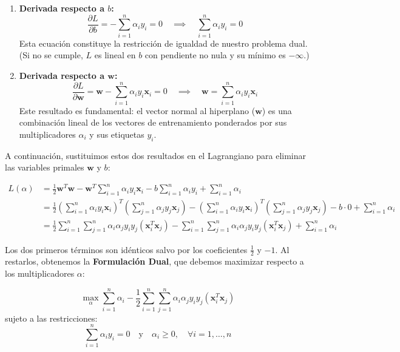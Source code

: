 \documentclass[12pt, a4paper]{article}
\begin{document}
\begin{enumerate}
    \item \textbf{Derivada respecto a $b$:}
    \[ \frac{\partial L}{\partial b} = -\sum_{i=1}^n \alpha_i y_i = 0 \quad \implies \quad \sum_{i=1}^n \alpha_i y_i = 0 \]
    Esta ecuación constituye la restricción de igualdad de nuestro problema dual. (Si no se cumple, $L$ es lineal en $b$ con pendiente no nula y su mínimo es $-\infty$.)

    \item \textbf{Derivada respecto a $\mathbf{w}$:}
    \[ \frac{\partial L}{\partial \mathbf{w}} = \mathbf{w} - \sum_{i=1}^n \alpha_i y_i \mathbf{x}_i = 0 \quad \implies \quad \mathbf{w} = \sum_{i=1}^n \alpha_i y_i \mathbf{x}_i \]
    Este resultado es fundamental: el vector normal al hiperplano ($\mathbf{w}$) es una combinación lineal de los vectores de entrenamiento ponderados por sus multiplicadores $\alpha_i$ y sus etiquetas $y_i$.
\end{enumerate}

\noindent A continuación, sustituimos estos dos resultados en el Lagrangiano para eliminar las variables primales $\mathbf{w}$ y $b$:

\begin{align*}
L(\alpha) &= \frac{1}{2} \mathbf{w}^T \mathbf{w} - \mathbf{w}^T \sum_{i=1}^n \alpha_i y_i \mathbf{x}_i - b \sum_{i=1}^n \alpha_i y_i + \sum_{i=1}^n \alpha_i \\
&= \frac{1}{2} \left( \sum_{i=1}^n \alpha_i y_i \mathbf{x}_i \right)^T \left( \sum_{j=1}^n \alpha_j y_j \mathbf{x}_j \right) - \left( \sum_{i=1}^n \alpha_i y_i \mathbf{x}_i \right)^T \left( \sum_{j=1}^n \alpha_j y_j \mathbf{x}_j \right) - b \cdot 0 + \sum_{i=1}^n \alpha_i \\
&= \frac{1}{2} \sum_{i=1}^n \sum_{j=1}^n \alpha_i \alpha_j y_i y_j (\mathbf{x}_i^T \mathbf{x}_j) - \sum_{i=1}^n \sum_{j=1}^n \alpha_i \alpha_j y_i y_j (\mathbf{x}_i^T \mathbf{x}_j) + \sum_{i=1}^n \alpha_i
\end{align*}

\noindent Los dos primeros términos son idénticos salvo por los coeficientes $\frac{1}{2}$ y $-1$. Al restarlos, obtenemos la \textbf{Formulación Dual}, que debemos maximizar respecto a los multiplicadores $\alpha$:

\[ \max_{\alpha} \sum_{i=1}^n \alpha_i - \frac{1}{2} \sum_{i=1}^n \sum_{j=1}^n \alpha_i \alpha_j y_i y_j (\mathbf{x}_i^T \mathbf{x}_j) \]
sujeto a las restricciones:
\[ \sum_{i=1}^n \alpha_i y_i = 0 \quad \text{y} \quad \alpha_i \geq 0, \quad \forall i=1, \dots, n \]
\end{document}
